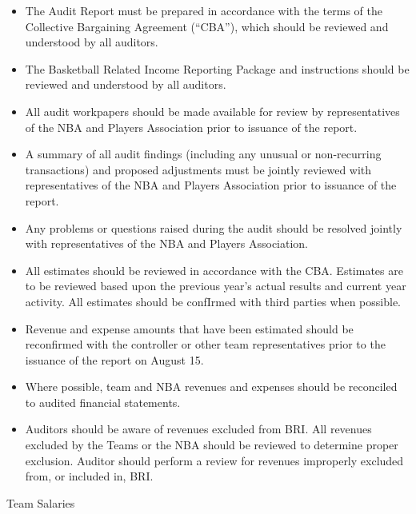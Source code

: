 \documentclass[
]{book}
\providecommand{\tightlist}{%
  \setlength{\itemsep}{0pt}\setlength{\parskip}{0pt}}
\begin{document}
\begin{itemize}
\tightlist
\item
  The Audit Report must be prepared in accordance with the terms of the Collective Bargaining Agreement (``CBA''), which should be reviewed and understood by all auditors.
\item
  The Basketball Related Income Reporting Package and instructions should be reviewed and understood by all auditors.
\item
  All audit workpapers should be made available for review by representatives of the NBA and Players Association prior to issuance of the report.
\item
  A summary of all audit findings (including any unusual or non-recurring transactions) and proposed adjustments must be jointly reviewed with representatives of the NBA and Players Association prior to issuance of the report.
\item
  Any problems or questions raised during the audit should be resolved jointly with representatives of the NBA and Players Association.
\item
  All estimates should be reviewed in accordance with the CBA. Estimates are to be reviewed based upon the previous year's actual results and current year activity. All estimates should be confIrmed with third parties when possible.
\item
  Revenue and expense amounts that have been estimated should be reconfirmed with the controller or other team representatives prior to the issuance of the report on August 15.
\item
  Where possible, team and NBA revenues and expenses should be reconciled to audited financial statements.
\item
  Auditors should be aware of revenues excluded from BRI. All revenues excluded by the Teams or the NBA should be reviewed to determine proper exclusion. Auditor should perform a review for revenues improperly excluded from, or included in, BRI.
\end{itemize}

Team Salaries
\end{document}
